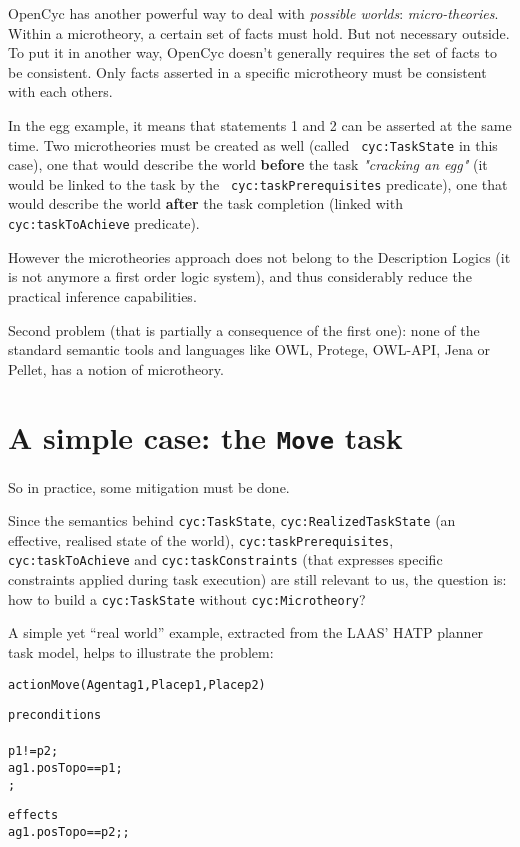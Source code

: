 {\sc OpenCyc} has another powerful way to deal with \emph{possible worlds}:
{\em micro-theories}. Within a microtheory, a certain set of facts must hold.
But not necessary outside. To put it in another way, {\sc OpenCyc} doesn't
generally requires the set of facts to be consistent. Only facts asserted in a
specific microtheory must be consistent with each others.

In the egg example, it means that statements 1 and 2 can be asserted at the
same time. Two microtheories must be created as well (called {\tt
cyc:TaskState} in this case), one that would describe the world {\bf before}
the task \emph{"cracking an egg"} (it would be linked to the task by the {\tt
cyc:taskPrerequisites} predicate), one that would describe the world {\bf
after} the task completion (linked with {\tt cyc:taskToAchieve} predicate).


However the microtheories approach does not belong to the Description Logics
(it is not anymore a first order logic system), and thus considerably reduce
the practical inference capabilities.

Second problem (that is partially a consequence of the first one): none of the
standard semantic tools and languages like OWL, Protege, OWL-API, Jena or
Pellet, has a notion of microtheory.


\section{A simple case: the {\tt Move} task}

So in practice, some mitigation must be done.

Since the semantics behind {\tt cyc:TaskState}, {\tt cyc:RealizedTaskState} (an
effective, realised state of the world), {\tt cyc:taskPrerequisites}, {\tt
cyc:taskToAchieve} and {\tt cyc:taskConstraints} (that expresses specific
constraints applied during task execution) are still relevant to us, the
question is: how to build a {\tt cyc:TaskState} without {\tt cyc:Microtheory}?

A simple yet ``real world'' example, extracted from the
LAAS' HATP planner task model, helps to illustrate the problem:

\begin{alltt}

action Move(Agent ag1, Place p1, Place p2)
 {
   preconditions
   {
     p1 != p2;
     ag1.posTopo == p1;
   };

   effects
   { ag1.posTopo == p2; };
 } 

\end{alltt}

